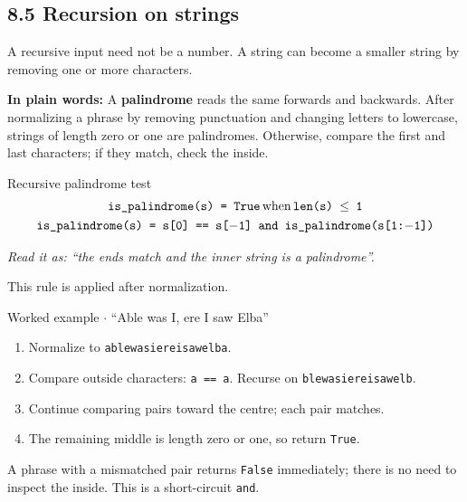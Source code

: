 \documentclass[11pt]{article}
\begin{document}
\begin{keepsection}
\section{8.5 Recursion on strings}

A recursive input need not be a number. A string can become a smaller string by removing one or more characters.

\begin{plainbox}\textbf{In plain words:} A \textbf{palindrome} reads the same forwards and backwards. After normalizing a phrase by removing punctuation and changing letters to lowercase, strings of length zero or one are palindromes. Otherwise, compare the first and last characters; if they match, check the inside.\end{plainbox}

\begin{equationcard}{Recursive palindrome test}
\[ \begin{gathered} \texttt{is\_palindrome(s) = True}\, \text{when}\, \texttt{len(s) \ensuremath{\leq} 1} \\ \texttt{is\_palindrome(s) = s[0] == s[\ensuremath{-}1] and is\_palindrome(s[1:\ensuremath{-}1])} \end{gathered} \]
{\small \emph{Read it as: “the ends match and the inner string is a palindrome”.}\par  This rule is applied after normalization.}
\end{equationcard}

\begin{workedbox}{Worked example \ensuremath{\cdot} “Able was I, ere I saw Elba”}
\begin{enumerate}
\item Normalize to \texttt{ablewasiereisawelba}.
\item Compare outside characters: \texttt{a == a}. Recurse on \texttt{blewasiereisawelb}.
\item Continue comparing pairs toward the centre; each pair matches.
\item The remaining middle is length zero or one, so return \texttt{True}.
\end{enumerate}
\end{workedbox}

A phrase with a mismatched pair returns \texttt{False} immediately; there is no need to inspect the inside. This is a short-circuit \texttt{and}.


\end{keepsection}
\end{document}
